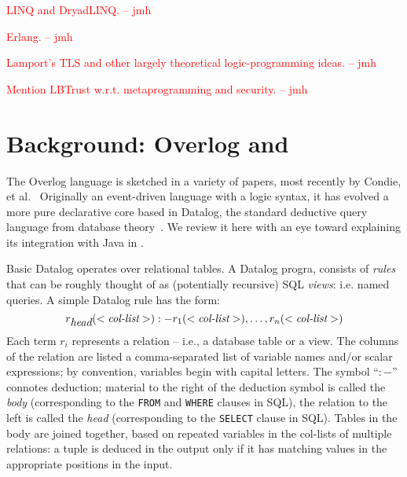 \documentclass{sig-alternate}
\newcommand{\jmh}[1]{{\textcolor{red}{#1 -- jmh}}}
\begin{document}
\jmh{LINQ and DryadLINQ.}

\jmh{Erlang.}

\jmh{Lamport's TLS and other largely theoretical logic-programming ideas.}

\jmh{Mention LBTrust w.r.t. metaprogramming and security.}

\section{Background: Overlog and \JOL}
The Overlog language is sketched in a variety of papers, most recently by Condie, et al.~\cite{evitaraced}  Originally an event-driven language with a logic syntax, it has evolved a more pure declarative core based in Datalog, the standard deductive query language from database theory~\cite{ullmanbook}.  We review it here with an eye toward explaining its integration with Java in \JOL.  

Basic Datalog operates over relational tables. A Datalog progra, consists of {\em rules} that can be roughly thought of as (potentially recursive) SQL {\em views}: i.e. named queries.  A simple Datalog rule has the form:
\[
	r_{\mbox{\em head}}(<\mbox{\em col-list}>) :- r_1(<\mbox{\em col-list}>), \ldots, r_n(<\mbox{\em col-list}>)
\]
Each term $r_i$ represents a relation -- i.e., a database table or a view.  The columns of the relation are listed a comma-separated list of variable names and/or scalar expressions; by convention, variables begin with capital letters.  The symbol ``$:-$'' connotes deduction; material to the right of the deduction symbol is called the {\em body} (corresponding to the {\tt FROM} and {\tt WHERE} clauses in SQL), the relation to the left is called the {\em head} (corresponding to the {\tt SELECT} clause in SQL).  Tables in the body are joined together, based on repeated variables in the col-lists of multiple relations: a tuple is deduced in the output only if it has matching values in the appropriate positions in the input.
\end{document}
